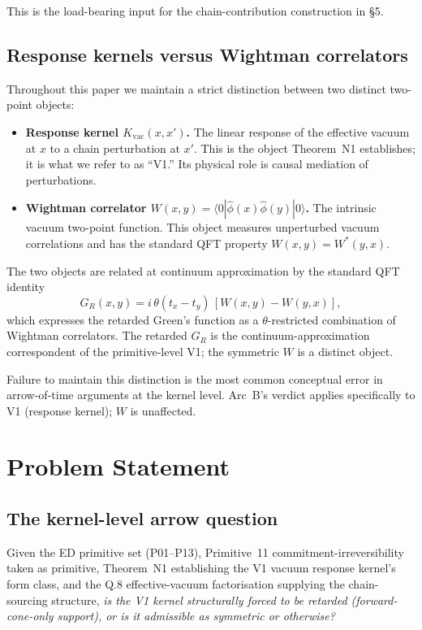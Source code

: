 \documentclass[11pt,a4paper]{article}
\begin{document}
This is the load-bearing input for the chain-contribution construction in \S5.

\subsection{Response kernels versus Wightman correlators}

Throughout this paper we maintain a strict distinction between two distinct two-point objects:
\begin{itemize}[leftmargin=1.5em]
  \item \textbf{Response kernel $K_\mathrm{vac}(x,x')$.} The linear response of the effective vacuum at $x$ to a chain perturbation at $x'$. This is the object Theorem~N1 establishes; it is what we refer to as ``V1.'' Its physical role is causal mediation of perturbations.
  \item \textbf{Wightman correlator $W(x,y) = \langle 0 | \hat{\phi}(x)\hat{\phi}(y) | 0 \rangle$.} The intrinsic vacuum two-point function. This object measures unperturbed vacuum correlations and has the standard QFT property $W(x,y) = W^*(y,x)$.
\end{itemize}

The two objects are related at continuum approximation by the standard QFT identity
\[
G_R(x,y) = i\,\theta(t_x - t_y)\,[W(x,y) - W(y,x)],
\]
which expresses the retarded Green's function as a $\theta$-restricted combination of Wightman correlators. The retarded $G_R$ is the continuum-approximation correspondent of the primitive-level V1; the symmetric $W$ is a distinct object.

Failure to maintain this distinction is the most common conceptual error in arrow-of-time arguments at the kernel level. Arc~B's verdict applies specifically to V1 (response kernel); $W$ is unaffected.

\section{Problem Statement}

\subsection{The kernel-level arrow question}

Given the ED primitive set (P01--P13), Primitive~11 commitment-irreversibility taken as primitive, Theorem~N1 establishing the V1 vacuum response kernel's form class, and the Q.8 effective-vacuum factorisation supplying the chain-sourcing structure, \emph{is the V1 kernel structurally forced to be retarded (forward-cone-only support), or is it admissible as symmetric or otherwise?}
\end{document}
